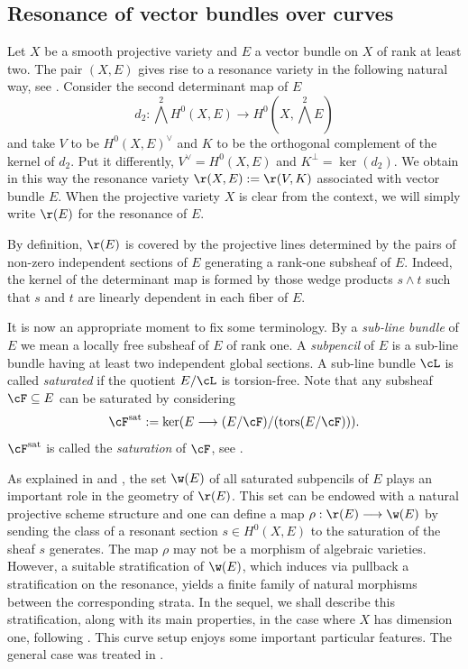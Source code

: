 \documentclass[10pt, leqno]{amsart}
\begin{document}
\subsection{Resonance of vector bundles over curves}

Let $X$ be a smooth projective variety and $E$ a vector bundle on $X$ of rank at least two. 
The pair $(X,E)$ gives rise to a resonance variety in the following natural way, see \cite{aprodu_koszul_2024}. Consider the second determinant map of $E$
\[
d_2: \textstyle{\bigwedge^2}H^0(X,E) \longrightarrow H^0(X,\textstyle{\bigwedge^2E})
\]
and take $V$ to be $H^0(X,E)^\vee$ and $K$ to be the orthogonal complement of the kernel of $d_2$. 
Put it differently, $V^\vee = H^0(X,E)$ and $K^\perp = \ker(d_2)$. 
We obtain in this way the resonance variety $\r(X,E): = \r(V,K)$ associated with vector bundle $E$. 
When the projective variety $X$ is clear from the context, we will simply write $\r(E)$ for the resonance of $E$.

By definition, $\r(E)$ is covered by the projective lines determined by the pairs of non-zero independent sections of $E$ generating a rank-one subsheaf of $E$. 
Indeed, the kernel of the determinant map is formed by those wedge products $s \wedge t$ such that $s$ and $t$ are linearly dependent in each fiber of $E$.

It is now an appropriate moment to fix some terminology.
By a \emph{sub-line bundle} of $E$ we mean a locally free subsheaf of $E$ of rank one. 
A \emph{subpencil} of $E$ is a sub-line bundle having at least two independent global sections.
A sub-line bundle $\cL$ is called \emph{saturated} if the quotient $E/\cL$ is torsion-free.
Note that any subsheaf $\cF \subseteq E$ can be saturated by considering 
\[
\cF^{\mathrm{sat}}:=\ker(E \longrightarrow (E/\cF)/(\mathrm{tors}(E/\cF))).
\]
$\cF^{\mathrm{sat}}$ is called the \emph{saturation} of $\cF$, see \cite[Definition 1.1.5]{huybrechts_2010}.

As explained in \cite[\S 6]{aprodu_reduced_2024} and \cite{aprodu_linear_2025}, the set $\w(E)$ of all saturated subpencils of $E$ plays an important role in the geometry of $\r(E)$. 
This set can be endowed with a natural projective scheme structure and one can define a map $\rho: \r(E) \longrightarrow \w(E)$ by sending the class of a resonant section $s \in H^0(X,E)$ to the saturation of the sheaf $s$ generates. 
The map $\rho$ may not be a morphism of algebraic varieties. 
However, a suitable stratification of $\w(E)$, which induces via pullback a stratification on the resonance, yields a finite family of natural morphisms between the corresponding strata. 
In the sequel, we shall describe this stratification, along with its main properties, in the case where $X$ has dimension one, following \cite[\S 4]{aprodu_linear_2025}.
This curve setup enjoys some important particular features. The general case was treated in \cite[\S 3]{aprodu_linear_2025}.
\end{document}
